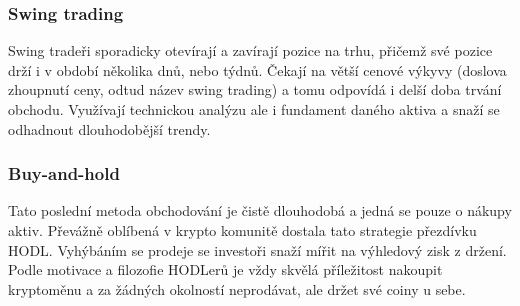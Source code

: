 \subsubsection{Swing trading}
Swing tradeři sporadicky otevírají a zavírají pozice na trhu, přičemž své pozice drží i v období několika dnů, nebo týdnů. Čekají na větší cenové
výkyvy (doslova zhoupnutí ceny, odtud název swing trading) a tomu odpovídá i delší doba trvání obchodu. Využívají technickou analýzu ale i fundament
daného aktiva a snaží se odhadnout dlouhodobější trendy.

\subsubsection{Buy-and-hold}
Tato poslední metoda obchodování je čistě dlouhodobá a jedná se pouze o nákupy aktiv. Převážně oblíbená v krypto komunitě dostala tato strategie přezdívku HODL.
Vyhýbáním se prodeje se investoři snaží mířit na výhledový zisk z držení. Podle motivace a filozofie HODLerů je vždy skvělá příležitost nakoupit kryptoměnu a za
žádných okolností neprodávat, ale držet své coiny u sebe.

\endinput